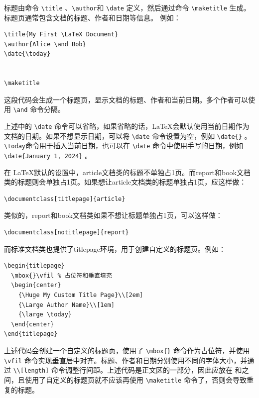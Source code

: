 标题由命令 \verb|\title| 、\verb|\author|和 \verb|\date| 定义，然后通过命令 \verb|\maketitle| 生成。标题页通常包含文档的标题、作者和日期等信息。 例如：
\begin{verbatim}
\title{My First \LaTeX Document}
\author{Alice \and Bob}
\date{\today}


\maketitle

\end{verbatim}
这段代码会生成一个标题页，显示文档的标题、作者和当前日期。多个作者可以使用 \verb|\and| 命令分隔。

上述中的 \verb|\date| 命令可以省略，如果省略的话，\LaTeX 会默认使用当前日期作为文档的日期。如果不想显示日期，可以将 \verb|\date| 命令设置为空，例如 \verb|\date{}| 。\verb|\today|命令用于插入当前日期，也可以在 \verb|\date| 命令中使用手写的日期，例如 \verb|\date{January 1, 2024}| 。

在 \LaTeX 默认的设置中，article文档类的标题不单独占1页。而report和book文档类的标题则会单独占1页。如果想让article文档类的标题单独占1页，应这样做：
\begin{verbatim}
\documentclass[titlepage]{article}
\end{verbatim}
类似的，report和book文档类如果不想让标题单独占1页，可以这样做：
\begin{verbatim}
\documentclass[notitlepage]{report}
\end{verbatim}

而标准文档类也提供了titlepage环境，用于创建自定义的标题页。例如：
\begin{verbatim}
\begin{titlepage}
  \mbox{}\vfil % 占位符和垂直填充
  \begin{center}
    {\Huge My Custom Title Page}\\[2em]
    {\Large Author Name}\\[1em]
    {\large \today}
  \end{center}
\end{titlepage}
\end{verbatim}
上述代码会创建一个自定义的标题页，使用了 \verb|\mbox{}| 命令作为占位符，并使用 \verb|\vfil| 命令实现垂直居中对齐。标题、作者和日期分别使用不同的字体大小，并通过 \verb|\\[length]| 命令调整行间距。上述代码是正文区的一部分，因此应放在 \verb|| 和\verb||之间，且使用了自定义的标题页就不应该再使用 \verb|\maketitle| 命令了，否则会导致重复的标题。

